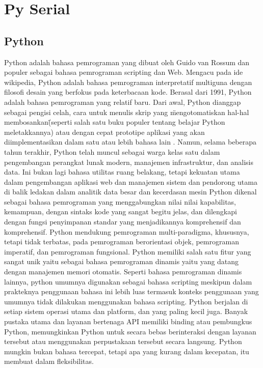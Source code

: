 \section{Py Serial}

	\subsection{Python}
	Python adalah bahasa pemrograman yang dibuat oleh Guido van Rossum dan populer sebagai bahasa pemrograman scripting dan Web. Mengacu pada ide wikipedia, Python adalah bahasa pemrograman interpretatif multiguna dengan filosofi desain yang berfokus pada keterbacaan kode. 
	Berasal dari 1991, Python adalah bahasa pemrograman yang relatif baru. Dari awal, Python dianggap sebagai pengisi celah, cara untuk menulis skrip yang \"mengotomatiskan hal-hal membosankan\" (seperti salah satu buku populer tentang belajar Python meletakkannya) atau dengan cepat prototipe aplikasi yang akan diimplementasikan dalam satu atau lebih bahasa lain .
	Namun, selama beberapa tahun terakhir, Python telah muncul sebagai warga kelas satu dalam pengembangan perangkat lunak modern, manajemen infrastruktur, dan analisis data. Ini bukan lagi bahasa utilitas ruang belakang, tetapi kekuatan utama dalam pengembangan aplikasi web dan manajemen sistem dan pendorong utama di balik ledakan dalam analitik data besar dan kecerdasan mesin
	Python dikenal sebagai bahasa pemrograman yang menggabungkan nilai nilai kapabilitas, kemampuan, dengan sintaks kode yang sangat begitu jelas, dan dilengkapi dengan fungsi penyimpanan standar yang menjadikannya komprehensif dan komprehensif. 
	Python mendukung pemrograman multi-paradigma, khususnya, tetapi tidak terbatas, pada pemrograman berorientasi objek, pemrograman imperatif, dan pemrograman fungsional. 
	Python memiliki salah satu fitur yang sangat unik yaitu sebagai bahasa pemrograman dinamis yaitu yang datang dengan manajemen memori otomatis. Seperti bahasa 
	pemrograman dinamis lainnya, python umumnya digunakan sebagai bahasa scripting meskipun dalam prakteknya penggunaan bahasa ini lebih luas termasuk konteks penggunaan yang umumnya tidak dilakukan menggunakan bahasa scripting. 
	Python berjalan di setiap sistem operasi utama dan platform, dan yang paling kecil juga. Banyak pustaka utama dan layanan bertenaga API memiliki binding atau pembungkus Python, memungkinkan Python untuk secara bebas berinteraksi dengan layanan tersebut atau menggunakan perpustakaan tersebut secara langsung. Python mungkin bukan bahasa tercepat, tetapi apa yang kurang dalam kecepatan, itu membuat dalam fleksibilitas.
